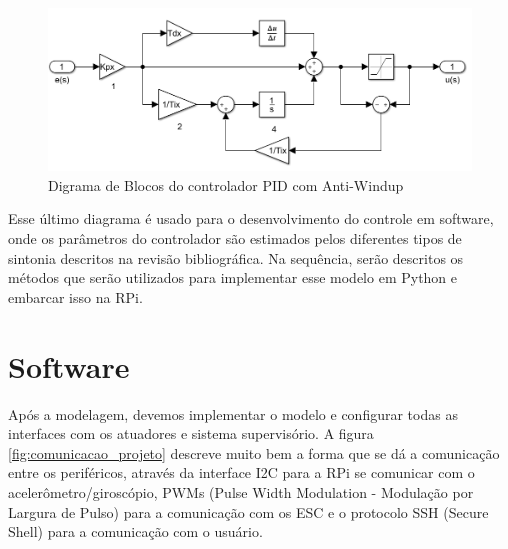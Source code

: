 \begin{figure}[H]
  \caption{Digrama de Blocos do controlador PID com Anti-Windup}
  \begin{center}
      \includegraphics[scale=.45]{metodologia/img/matlab_pid_antiwindup}
  \end{center}
  \label{fig:simulink_modelo_completo_aberto}
\end{figure}

Esse último diagrama é usado para o desenvolvimento do controle em software, onde os parâmetros do controlador são estimados pelos diferentes tipos de sintonia descritos na revisão bibliográfica. Na sequência, serão descritos os métodos que serão utilizados para implementar esse modelo em Python e embarcar isso na RPi.



\section{Software}

Após a modelagem, devemos implementar o modelo e configurar todas as interfaces com os atuadores e sistema supervisório. A figura \ref{fig:comunicacao_projeto} descreve muito bem a forma que se dá a comunicação entre os periféricos, através da interface I2C para a RPi se comunicar com o acelerômetro/giroscópio, PWMs (Pulse Width Modulation - Modulação por Largura de Pulso) para a comunicação com os ESC e o protocolo SSH (Secure Shell) para a comunicação com o usuário.

